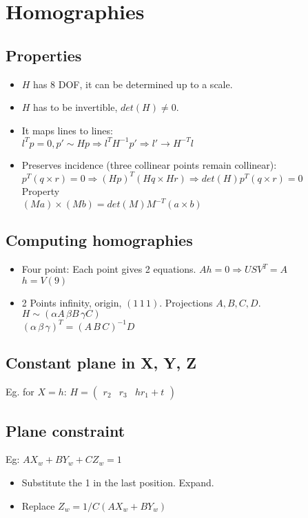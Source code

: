 \section{Homographies}
\subsection*{Properties}
\begin{itemize}
  \item $H$ has 8 DOF, it can be determined up to a scale.
  \item $H$ has to be invertible, $det(H) \neq 0$.
  \item It maps lines to lines:\\
    $l^T p = 0, p' \sim H p \Rightarrow l^T H^{-1} p' \Rightarrow l'
    \rightarrow H^{-T} l$
  \item Preserves incidence (three collinear points remain collinear):\\
    $p^T(q\times r) = 0 \Rightarrow (H p)^T (H q \times H r) \Rightarrow
    det(H) p^T (q \times r) = 0$\\
    Property \\
    $(M a) \times (M b) = det(M) M^{-T} (a \times b)$
\end{itemize}

\subsection*{Computing homographies}
\begin{itemize}
  \item Four point: Each point gives 2 equations.
    $A h = 0 \Rightarrow U S V^T = A$\\
    $h = V(9)$
  \item 2 Points infinity, origin, $(1\,1\,1)$. Projections $A, B, C, D$.\\
    $H \sim (\alpha A \, \beta B \, \gamma C)$\\
    $(\alpha \, \beta \, \gamma)^T = (A \, B \, C)^{-1} D$
\end{itemize}

\subsection*{Constant plane in X, Y, Z}
Eg. for $X = h$:  $H = \begin{pmatrix}
  r_2 & r_3 & h r_1 + t
\end{pmatrix}$

\subsection*{Plane constraint}
Eg: $A X_w + B Y_w + C Z_w = 1$
\begin{itemize}
  \item Substitute the 1 in the last position. Expand.
  \item Replace $Z_w = 1/C (A X_w + B Y_w)$
\end{itemize}

